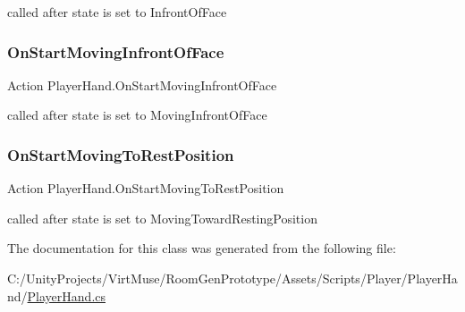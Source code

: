called after state is set to Infront\+Of\+Face 

\mbox{\label{class_player_hand_ab33d70a8efd0adeed59aa3f5a5747349}} 
\subsubsection{\texorpdfstring{On\+Start\+Moving\+Infront\+Of\+Face}{OnStartMovingInfrontOfFace}}
{\footnotesize\ttfamily Action Player\+Hand.\+On\+Start\+Moving\+Infront\+Of\+Face}



called after state is set to Moving\+Infront\+Of\+Face 

\mbox{\label{class_player_hand_ac82ac43be97123cde5f02f5811a63397}} 
\subsubsection{\texorpdfstring{On\+Start\+Moving\+To\+Rest\+Position}{OnStartMovingToRestPosition}}
{\footnotesize\ttfamily Action Player\+Hand.\+On\+Start\+Moving\+To\+Rest\+Position}



called after state is set to Moving\+Toward\+Resting\+Position 



The documentation for this class was generated from the following file\+:\begin{DoxyCompactItemize}
\item 
C\+:/\+Unity\+Projects/\+Virt\+Muse/\+Room\+Gen\+Prototype/\+Assets/\+Scripts/\+Player/\+Player\+Hand/\mbox{\hyperlink{_player_hand_8cs}{Player\+Hand.\+cs}}\end{DoxyCompactItemize}
